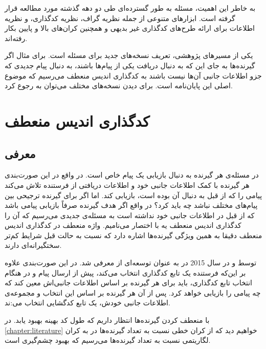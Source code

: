 به خاطر این اهمیت، مسئله \icod به طور گسترده‌ای طی دو دهه گذشته مورد مطالعه قرار گرفته است. ابزارهای متنوعی از جمله نظریه گراف، نظریه کدگذاری، و نظریه اطلاعات برای ارائه طرح‌های کدگذاری غیر بدیهی
\cite{25, 101, 22, 43, 114, 29, 8, 104, 81, 130, 7, 9, 149, 116, 80, 141, 146, 162}
و همچنین کران‌‌های بالا و پایین 
\cite{160, 22, 55, 28, 17, 141}
 بکار رفته‌اند.
 
 یکی از مسیرهای پژوهشی، تعریف نسخه‌های جدید برای مسئله است. برای مثال اگر گیرنده‌ها به جای این که به دنبال دریافت یکی از پیام‌ها باشند، به دنبال پیام جدیدی که جزو اطلاعات جانبی آن‌ها نیست باشند به کدگذاری اندیس منعطف می‌رسیم که موضوع اصلی این پایان‌نامه است. برای دیدن نسخه‌های مختلف می‌توان به
 \cite{pliablefirstpaper, verypliable, byrne2023preferential}
 رجوع کرد.
 \pagebreak
 \section{کدگذاری اندیس منعطف}
 
 \subsection{معرفی}
 در مسئله‌ی
 \icod
 هر گیرنده به دنبال بازیابی یک پیام خاص است. در واقع در این صورت‌بندی هر گیرنده با کمک اطلاعات جانبی خود و اطلاعات دریافتی از فرستنده تلاش می‌کند پیامی را که از قبل به دنبال آن بوده است، بازیابی کند. اما اگر برای گیرنده ترجیحی بین پیام‌های مختلف نباشد چه باید کرد؟ در واقع اگر هدف گیرنده صرفاً بازیابی پیامی باشد که از قبل در اطلاعات جانبی خود نداشته است به مسئله‌ی جدیدی می‌رسیم که آن را کدگذاری اندیس منعطف یه با اختصار \picod می‌نامیم. واژه منعطف در کدگذاری اندیس منعطف دقیقا به همین ویژگی گیرنده‌ها اشاره دارد که نسبت به حالت قبل شرایط کم‌تر سختگیرانه‌ای دارند.
 
 \picod توسط 
 و 
  در سال 2015 در
 \cite{pliablefirstpaper}
 به عنوان توسعه‌ای از \icod معرفی شد. در این صورت‌بندی علاوه بر این‌که فرستنده یک تابع کدگذاری انتخاب می‌کند، پیش از ارسال پیام و در هنگام انتخاب تابع کدگذاری، باید برای هر گیرنده بر اساس اطلاعات جانبی‌اش معین کند که چه پیامی را بازيابی خواهد کرد. پس از آن هر گیرنده بر اساس این انتخاب و مجموعه‌ی اطلاعات جانبی خودش، یک تابع کدگشایی انتخاب می‌:ند.
 
 با منعطف کردن گیرنده‌ها انتظار داریم که طول کد بهینه بهبود یابد. در 
 \autoref{chapter:literature}
 خواهیم دید که از کران خطی نسبت به تعداد گیرنده‌ها در
 \icod
 به کران لگاریتمی نسبت به تعداد گیرنده‌ها می‌رسیم که بهبود چشم‌گیری است.
 
